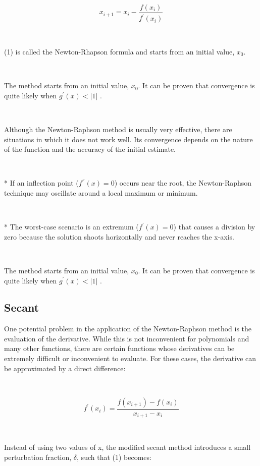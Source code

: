 \documentclass[conference]{IEEEtran}
\begin{document}
\begin{equation}
x_{i+1} = x_{i} - \frac{f(x_{i})}{f^{'}(x_{i})}
\end{equation}


\


(1) is called the Newton-Rhapson formula and starts from an initial value, $ x_{0} $.


\ 


The method starts from an initial value, $ x_{0} $. It can be proven that convergence is quite likely when $ g^{'}(x) < |1| $ .

\

Although the Newton-Raphson method is usually very effective, 
there are situations in which it does not work well. Its convergence depends on the nature of the function and the accuracy of the initial estimate.

\


* If an inflection point ($ f^{''}(x) = 0 $) occurs near the root, the Newton-Raphson technique may oscillate around a local maximum or minimum.

\


* The worst-case scenario is an extremum ($ f^{'}(x) = 0 $) that causes a division by zero because the solution shoots horizontally and never reaches the x-axis.

\

The method starts from an initial value, $ x_{0} $. It can be proven that convergence is quite likely when $ g^{'}(x) < |1| $ .


\subsection{Secant}

One potential problem in the application of the Newton-Raphson method is the evaluation of the derivative. While this is not inconvenient for polynomials and many other functions, there are certain functions whose derivatives can be extremely difficult or inconvenient to evaluate. For these cases, the derivative can be approximated by a direct difference:


\


\begin{equation}
f^{'}(x_{i}) = \frac{f(x_{i+1}) - f(x_{i})}{x_{i+1} - x_{i}}
\end{equation}

\


Instead of using two values of x, the modified secant method introduces a small perturbation fraction, $ \delta$, such that (1) becomes:
\end{document}
